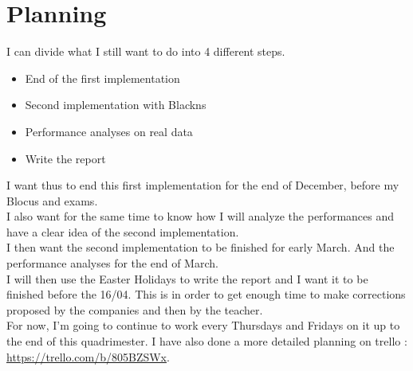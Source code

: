 \documentclass[10pt]{article}
\begin{document}
\section{Planning}
I can divide what I still want to do into 4 different steps.
\begin{itemize}
\item End of the first implementation
\item Second implementation with Blackns
\item Performance analyses on real data
\item Write the report
\end{itemize}

I want thus to end this first implementation for the end of December, before my Blocus and exams. \\
I also want for the same time to know how I will analyze the performances and have a clear idea of the second implementation.\\

I then want the second implementation to be finished for early March. And the performance analyses for the end of March.\\
I will then use the Easter Holidays to write the report and I want it to be finished before the 16/04. This is in order to get enough time to make corrections proposed by the companies and then by the teacher.\\

For now, I'm going to continue to work every Thursdays and Fridays on it up to the end of this quadrimester. I have also done a more detailed planning on trello : \url{https://trello.com/b/805BZSWx}.




\end{document}
